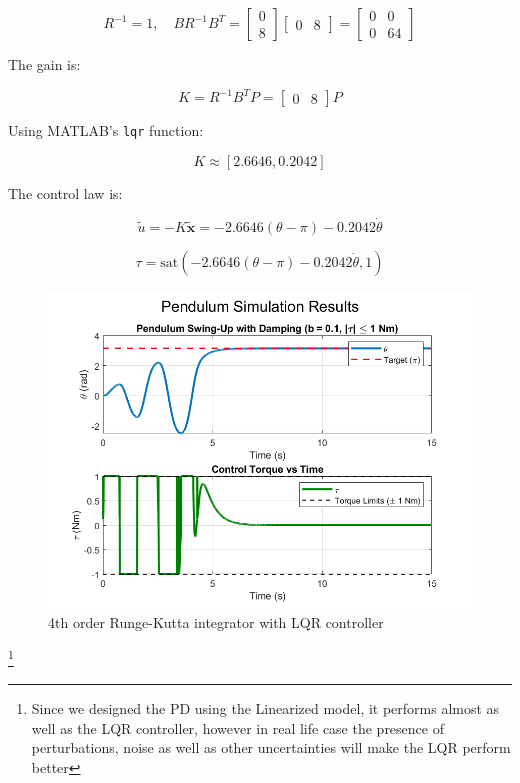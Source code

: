 \documentclass[12pt,a4paper]{article}
\begin{document}
\[
R^{-1} = 1, \quad B R^{-1} B^T = \begin{bmatrix} 0 \\ 8 \end{bmatrix} \begin{bmatrix} 0 & 8 \end{bmatrix} = \begin{bmatrix} 0 & 0 \\ 0 & 64 \end{bmatrix}
\]

The gain is:

\begin{equation}
K = R^{-1} B^T P = \begin{bmatrix} 0 & 8 \end{bmatrix} P
\end{equation}

Using MATLAB’s \texttt{lqr} function:

\[
K \approx [2.6646, 0.2042]
\]

The control law is:

\begin{equation}
\tilde{u} = -K \tilde{\mathbf{x}} = -2.6646 (\theta - \pi) - 0.2042 \dot{\theta}
\end{equation}

\[
\tau = \text{sat}(-2.6646 (\theta - \pi) - 0.2042 \dot{\theta}, 1)
\]


\begin{figure}[htbp]
  \centering
  \includegraphics[width=0.9\linewidth]{../figs/lqr_rk_pd_swing_up.png}
  \caption{4th order Runge-Kutta integrator with LQR controller}
  \label{fig:lqr_rk_pd_swing_up}
\end{figure}
\footnote{Since we designed the PD using the Linearized model, it performs almost as well as the LQR controller, however in real life case the presence of perturbations, noise as well as other uncertainties will make the LQR perform better}
\end{document}
